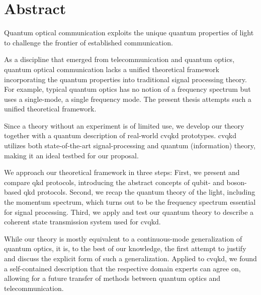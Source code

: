 \section*{Abstract}

Quantum optical communication exploits the unique quantum properties of light to challenge the frontier of established communication.

As a discipline that emerged from telecommunication and quantum optics, quantum optical communication lacks a unified theoretical framework incorporating the quantum properties into traditional signal processing theory.
For example, typical quantum optics has no notion of a frequency spectrum but uses a single-mode, a single frequency mode.
The present thesis attempts such a unified theoretical framework.

Since a theory without an experiment is of limited use, we develop our theory together with a quantum description of real-world \gls{cvqkd} prototypes.
\gls{cvqkd} utilizes both state-of-the-art signal-processing and quantum (information) theory, making it an ideal testbed for our proposal.

We approach our theoretical framework in three steps: First, we present and compare \acrshort{qkd} protocols, introducing the abstract concepts of qubit- and boson-based \acrshort{qkd} protocols.
Second, we recap the quantum theory of the light, including the momentum spectrum, which turns out to be the frequency spectrum essential for signal processing.
Third, we apply and test our quantum theory to describe a coherent state transmission system used for \gls{cvqkd}.

While our theory is mostly equivalent to a continuous-mode generalization of quantum optics, it is, to the best of our knowledge, the first attempt to justify and discuss the explicit form of such a generalization.
Applied to \gls{cvqkd}, we found a self-contained description that the respective domain experts can agree on, allowing for a future transfer of methods between quantum optics and telecommunication.
